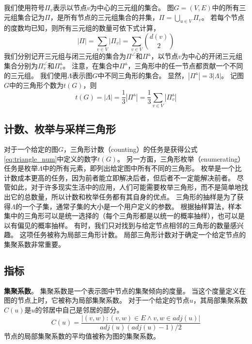 我们使用符号$\Pi_v$表示以节点$v$为中心的三元组的集合。
图$G=(V,E)$中的所有三元组集合记为$\Pi$，是所有节点的三元组集合的并集，$\Pi=\bigcup_{u\in V}\Pi_v$。
若每个节点的度数均已知，则所有三元组的数量可依下式计算，
\begin{equation}
    |\Pi|=\sum_{v\in V}|\Pi_v|=\sum_{v\in V}\binom{d(v)}{2} 
    \label{eq:triple_num}
\end{equation}
我们分别记开三元组与闭三元组的集合为$\Pi^\angle $和$\Pi^\vartriangle $，以节点$v$为中心的开闭三元组集合分别为$\Pi^\angle_v$和$\Pi^\vartriangle_v$。
注意，在集合中$\Pi^\vartriangle $，三角形中的任一节点都贡献一个不同的三元组。
我们使用$\Lambda$表示图$G$中不同三角形的集合。
显然，$|\Pi^\vartriangle|=3|\Lambda|$。
记图$G$中的三角形个数为$t(G)$，则
\begin{equation}
    t(G)=|\Lambda|=\frac{1}{3}|\Pi^\vartriangle|=\frac{1}{3}\sum_{v\in V}|\Pi^\vartriangle_v|
    \label{eq:triangle_num}
\end{equation}

\subsection{计数、枚举与采样三角形}

对于一个给定的图$G$，三角形计数（counting）的任务是获得公式\ref{eq:triangle_num}中定义的数字$t(G)$。
另一方面，三角形枚举（enumerating）任务是枚举$\Lambda$中的所有元素，即列出给定图中所有不同的三角形。
枚举是一个比计数成本更高的任务，因为前者能立即解决后者，但后者不一定能解决前者。
尽管如此，对于许多现实生活中的应用，人们可能需要枚举三角形，而不是简单地找出它的总数量，所以计数和枚举任务都有其自身的优点。
三角形的抽样是为了获得$\Lambda$的一个子集，通常子集的大小是一个用户定义的参数。
根据抽样算法，样本集中的三角形可以是统一选择的（每个三角形都是以统一的概率抽样），也可以是以有偏见的概率抽样。
有时，我们只对找到与给定节点相邻的三角形的数量感兴趣。
这项任务被称为局部三角形计数。
局部三角形计数对于确定一个给定节点的集聚系数非常重要。

\subsection{指标}

\textbf{集聚系数}。
集聚系数是一个表示图中节点的集聚倾向的度量。
当这个度量定义在图的节点上时，它被称为局部集聚系数。
对于一个给定的节点$u$，其局部集聚系数$C(u)$是$u$的邻居中自己是邻居的部分。
\begin{equation}
    C(u)=\frac{|(v,w):(v,w)\in E\land v,w\in adj(u)|}{adj(u)(adj(u)-1)/2}
    \label{eq:clustering_coef}
\end{equation}
节点的局部集聚系数的平均值被称为图的集聚系数。

